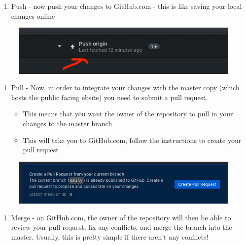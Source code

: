 \documentclass[]{book}
\providecommand{\tightlist}{%
  \setlength{\itemsep}{0pt}\setlength{\parskip}{0pt}}
\begin{document}
\begin{enumerate}
\def\labelenumi{\arabic{enumi}.}
\setcounter{enumi}{5}
\tightlist
\item
  Push - now push your changes to GitHub.com - this is like saving your local changes online
\end{enumerate}

\begin{figure}
\centering
\includegraphics{images/research_protocols/github/26.png}
\caption{}
\end{figure}

\begin{enumerate}
\def\labelenumi{\arabic{enumi}.}
\setcounter{enumi}{6}
\tightlist
\item
  Pull - Now, in order to integrate your changes with the master copy (which hosts the public facing ebsite) you need to submit a pull request.

  \begin{itemize}
  \tightlist
  \item
    This means that you want the owner of the repository to pull in your changes to the master branch
  \item
    This will take you to GitHub.com, follow the instructions to create your pull request
  \end{itemize}
\end{enumerate}

\begin{figure}
\centering
\includegraphics{images/research_protocols/github/27.png}
\caption{}
\end{figure}

\begin{enumerate}
\def\labelenumi{\arabic{enumi}.}
\setcounter{enumi}{7}
\tightlist
\item
  Merge - on GitHub.com, the owner of the repository will then be able to review your pull request, fix any conflicts, and merge the branch into the master. Usually, this is pretty simple if there aren't any conflicts!
\end{enumerate}
\end{document}
